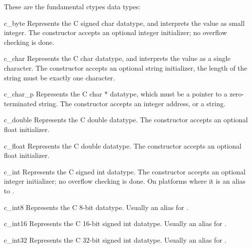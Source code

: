 These are the fundamental ctypes data types:

\begin{classdesc*}{c_byte}
Represents the C signed char datatype, and interprets the value as
small integer. The constructor accepts an optional integer
initializer; no overflow checking is done.
\end{classdesc*}

\begin{classdesc*}{c_char}
Represents the C char datatype, and interprets the value as a single
character. The constructor accepts an optional string initializer,
the length of the string must be exactly one character.
\end{classdesc*}

\begin{classdesc*}{c_char_p}
Represents the C char * datatype, which must be a pointer to a
zero-terminated string. The constructor accepts an integer
address, or a string.
\end{classdesc*}

\begin{classdesc*}{c_double}
Represents the C double datatype. The constructor accepts an
optional float initializer.
\end{classdesc*}

\begin{classdesc*}{c_float}
Represents the C double datatype. The constructor accepts an
optional float initializer.
\end{classdesc*}

\begin{classdesc*}{c_int}
Represents the C signed int datatype. The constructor accepts an
optional integer initializer; no overflow checking is done. On
platforms where  it is an alias to
.
\end{classdesc*}

\begin{classdesc*}{c_int8}
Represents the C 8-bit  datatype. Usually an alias for
.
\end{classdesc*}

\begin{classdesc*}{c_int16}
Represents the C 16-bit signed int datatype. Usually an alias for
.
\end{classdesc*}

\begin{classdesc*}{c_int32}
Represents the C 32-bit signed int datatype. Usually an alias for
.
\end{classdesc*}

